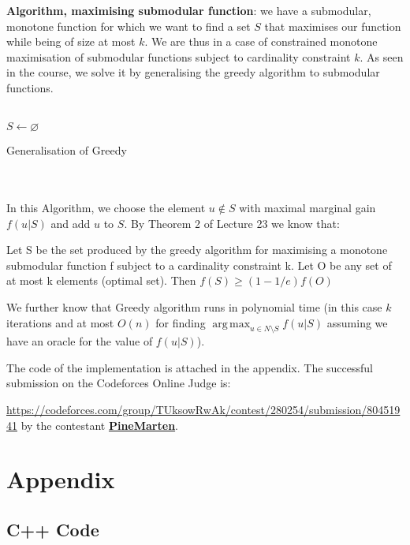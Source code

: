 \documentclass[10pt,usenames,dvipsnames]{article}
\DeclareMathOperator*{\argmax}{arg\,max}
\newenvironment{theorem}[2][Theorem]{\begin{trivlist}
  \item[\hskip \labelsep {\bfseries #1}\hskip \labelsep {\bfseries #2.}]}{\end{trivlist}}
\newenvironment{exercise}[2][Exercise]{\begin{trivlist}
  \item[\hskip \labelsep {\bfseries #1}\hskip \labelsep {\bfseries #2.}]}{\end{trivlist}}
\begin{document}
\begin{exercise}{4}
\textbf{Algorithm, maximising submodular function}: we have a submodular, monotone function for which we want to find a set $S$ that maximises our function while being of size at most $k$. We are thus in a case of constrained monotone maximisation of submodular functions subject to cardinality constraint $k$. As seen in the course, we solve it by generalising the greedy algorithm to submodular functions. 
 \\ \\
\begin{algorithm}[H]
\SetAlgoLined
{}
 $S \leftarrow \varnothing$\;
 \For{$i = 1$ to $k$ do}{
 Let $u_i = \argmax_{u \in N \setminus S}f(u|S)$\;
 $S\leftarrow S \cup \{ u_i \}$}
 \caption{Generalisation of Greedy}
\end{algorithm}\mbox{}
\\ \\
In this Algorithm, we choose the element $u \notin S$ with maximal marginal gain $f(u|S)$ and add $u$ to $S$. By Theorem 2 of Lecture 23 we know that: 
\begin{theorem}{2}
Let S be the set produced by the greedy algorithm for maximising a monotone submodular function f subject to a cardinality constraint k. Let O be any set of at most k elements (optimal set). Then $f(S) \geq (1-1/e)f(O)$
\end{theorem}

We further know that Greedy algorithm runs in polynomial time (in this case $k$ iterations and at most $O(n)$ for finding $\argmax_{u \in N \setminus S}f(u|S)$ assuming we have an oracle for the value of $f(u|S)$). 

  \end{exercise}
 \newpage
  \begin{exercise}{5}
    The code of the implementation is attached in the appendix. The successful
    submission on the Codeforces Online Judge is: 

    \url{https://codeforces.com/group/TUksowRwAk/contest/280254/submission/80451941}
    by the contestant \href{https://codeforces.com/profile/PineMarten}{\textbf{\color{blue-violet}PineMarten}}.
  \end{exercise}

  \section*{Appendix}
  \subsection*{C++ Code}
  
 
\end{document}
